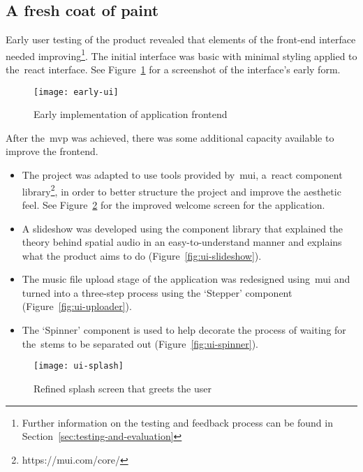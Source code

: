 \subsection{A fresh coat of paint}\label{subsec:a-fresh-coat-of-paint}

Early user testing of the product revealed
that elements of the front-end interface needed improving\footnote{Further information on the testing and feedback process can be found in Section~\ref{sec:testing-and-evaluation}}.
The initial interface was basic with minimal styling applied to the~\gls{react} interface.
See Figure~\ref{fig:early-fe} for a screenshot of the interface's early form.

\begin{figure}[!htb]
    \minipage{\textwidth}
    \texttt{[image: early-ui]}
    \caption{Early implementation of application frontend}\label{fig:early-fe}
    \endminipage\hfill
\end{figure}

After the~\gls{mvp} was achieved, there was some additional capacity available to improve the frontend.

\begin{itemize}
    \item The project was adapted to use tools provided by~\gls{mui},
    a~\gls{react} component library\footnote{https://mui.com/core/},
    in order to better structure the project and improve the aesthetic feel.
    See Figure~\ref{fig:ui-splash} for the improved welcome screen for the application.
    \item A slideshow was developed using the component library that explained the theory behind spatial audio in an easy-to-understand manner and explains what the product aims to do (Figure~\ref{fig:ui-slideshow}).
    \item The music file upload stage of the application was redesigned using~\gls{mui} and turned into a three-step process using the `Stepper' component (Figure~\ref{fig:ui-uploader}).
    \item The `Spinner' component is used to help decorate the process of waiting for the~\glspl{stem} to be separated out (Figure~\ref{fig:ui-spinner}).
\end{itemize}

\begin{figure}[!htb]
    \minipage{\textwidth}
    \texttt{[image: ui-splash]}
    \caption{Refined splash screen that greets the user}\label{fig:ui-splash}
    \endminipage\hfill
\end{figure}

